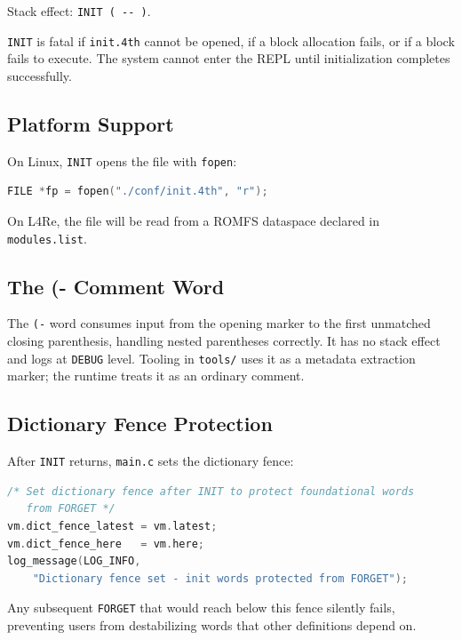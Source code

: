 Stack effect: \texttt{INIT~(~-{}-~)}.

\texttt{INIT} is fatal if \texttt{init.4th} cannot be opened, if a block
allocation fails, or if a block fails to execute. The system cannot enter the
REPL until initialization completes successfully.

\subsection{Platform Support}

On Linux, \texttt{INIT} opens the file with \texttt{fopen}:

\begin{lstlisting}[language=C]
FILE *fp = fopen("./conf/init.4th", "r");
\end{lstlisting}

On L4Re, the file will be read from a ROMFS dataspace declared in
\texttt{modules.list}.

\subsection{The (- Comment Word}

The \texttt{(-} word consumes input from the opening marker to the first
unmatched closing parenthesis, handling nested parentheses correctly. It has
no stack effect and logs at \texttt{DEBUG} level. Tooling in
\texttt{tools/} uses it as a metadata extraction marker; the runtime treats it
as an ordinary comment.

\subsection{Dictionary Fence Protection}

After \texttt{INIT} returns, \texttt{main.c} sets the dictionary fence:

\begin{lstlisting}[language=C]
/* Set dictionary fence after INIT to protect foundational words
   from FORGET */
vm.dict_fence_latest = vm.latest;
vm.dict_fence_here   = vm.here;
log_message(LOG_INFO,
    "Dictionary fence set - init words protected from FORGET");
\end{lstlisting}

Any subsequent \texttt{FORGET} that would reach below this fence silently
fails, preventing users from destabilizing words that other definitions depend
on.

